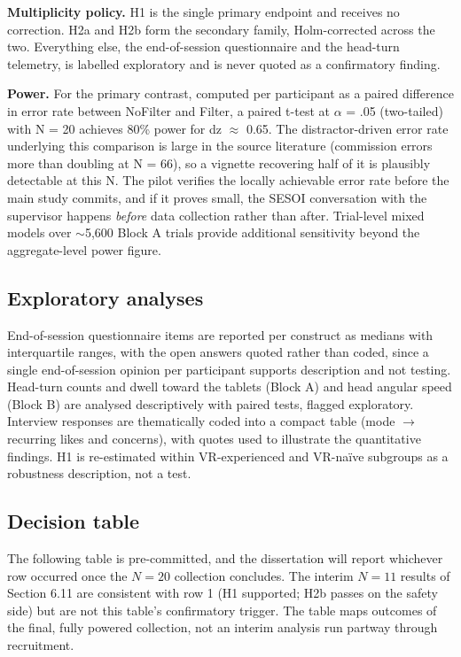 \textbf{Multiplicity policy.} H1 is the single primary endpoint and receives no correction. H2a and H2b
form the secondary family, Holm-corrected across the two. Everything else, the end-of-session
questionnaire and the head-turn telemetry, is labelled exploratory and is never quoted as a
confirmatory finding.

\textbf{Power.} For the primary contrast, computed per participant as a paired difference in error rate
between NoFilter and Filter, a paired t-test at $\alpha$ = .05 (two-tailed) with N = 20 achieves 80\%
power for dz $\approx$ 0.65. The distractor-driven error rate underlying this comparison is large in the
source literature (commission errors more than doubling at N = 66), so a vignette recovering half of
it is plausibly detectable at this N. The pilot verifies the locally achievable error rate before the
main study commits, and if it proves small, the SESOI conversation with the supervisor happens
\textit{before} data collection rather than after. Trial-level mixed models over $\sim$5,600 Block A
trials provide additional sensitivity beyond the aggregate-level power figure.

\subsection{Exploratory analyses}

End-of-session questionnaire items are reported per construct as
medians with interquartile ranges, with the open answers quoted rather than coded, since a
single end-of-session opinion per participant supports description and not testing. Head-turn counts and dwell toward the tablets (Block A) and head angular
speed (Block B) are analysed descriptively with paired tests, flagged exploratory. Interview responses
are thematically coded into a compact table (mode $\rightarrow$ recurring likes and concerns), with quotes
used to illustrate the quantitative findings. H1 is re-estimated within VR-experienced and VR-naïve
subgroups as a robustness description, not a test.

\subsection{Decision table}

The following table is pre-committed, and the dissertation will report whichever row occurred once the
$N = 20$ collection concludes. The interim $N = 11$ results of Section 6.11 are consistent with row 1
(H1 supported; H2b passes on the safety side) but are not this table's confirmatory trigger. The
table maps outcomes of the final, fully powered collection, not an interim analysis run partway
through recruitment.

